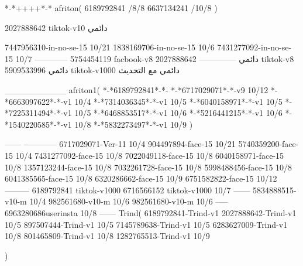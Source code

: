 *-*++++*-*
afriton(
6189792841 /8/8
6637134241 /10/8
)

2027888642 tiktok-v10
دائمي


7447956310-in-no-se-15 10/21
1838169706-in-no-se-15 10/6
7431277092-in-no-se-15 10/7
------------
5754454119 facbook-v8
دائمي
--------------
2027888642 tiktok-v8
دائمي
5909533996 tiktok-v1000
دائمي مع التحديث

__________
afriton1(
*-*6189792841*-*-
*-*6717029071*-*-v9 10/12
*-*6663097622*-*-v1 10/4
*-*7314036345*-*-v1 10/5
*-*6040158971*-*-v1 10/5
*-*7225311494*-*-v1 10/5
*-*6468853517*-*-v1 10/6
*-*5216441215*-*-v1 10/6
*-*1540220585*-*-v1 10/8
*-*5832273497*-*-v1 10/9
)

------
------------
6717029071-Ver-11
10/4
904497894-face-15 10/21
5740359200-face-15 10/4
7431277092-face-15 10/8
7022049118-face-15 10/8
6040158971-face-15 10/8
1357123244-face-15 10/8
7032261728-face-15 10/8
5998488456-face-15 10/8
6041385565-face-15 10/8
6320286662-face-15 10/9
6751582822-face-15 10/12
---------
6189792841 tiktok-v1000
6716566152 tiktok-v1000
10/7
------
5834888515-v10-m 10/4
982561680‏-v10-m 10/6
982561680-v10-m 10/6
-----
6963280686userinsta 10/8
------
Trind(
6189792841-Trind-v1 
2027888642-Trind-v1 10/5
897507444-Trind-v1 10/5
7145789638-Trind-v1 10/5
6283627009-Trind-v1 10/8
801465809-Trind-v1 10/8
1282765513-Trind-v1 10/9

)
